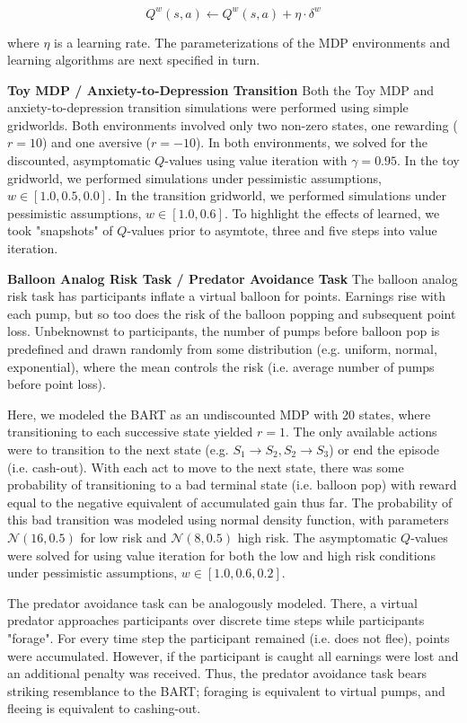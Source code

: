 \documentclass[11pt]{article} %
\begin{document}
\begin{equation*}
Q^w(s,a) \leftarrow Q^w(s,a) + \eta \cdot \delta^w
\end{equation*}

where $\eta$ is a learning rate. The parameterizations of the MDP environments and learning algorithms are next specified in turn.

\textbf{Toy MDP / Anxiety-to-Depression Transition} Both the Toy MDP and anxiety-to-depression transition simulations were performed using simple gridworlds. Both environments involved only two non-zero states, one rewarding ($r=10$) and one aversive ($r=-10$). In both environments, we solved for the discounted, asymptomatic $Q$-values using value iteration with $\gamma = 0.95$. In the toy gridworld, we performed simulations under pessimistic assumptions, $w \in [1.0, 0.5, 0.0]$. In the transition gridworld, we performed simulations under pessimistic assumptions, $w \in [1.0, 0.6]$. To highlight the effects of learned, we took "snapshots" of $Q$-values prior to asymtote, three and five steps into value iteration. 

\textbf{Balloon Analog Risk Task / Predator Avoidance Task} The balloon analog risk task \citep{Lejuez2002} has participants inflate a virtual balloon for points. Earnings rise with each pump, but so too does the risk of the balloon popping and subsequent point loss. Unbeknownst to participants, the number of pumps before balloon pop is predefined and drawn randomly from some distribution (e.g. uniform, normal, exponential), where the mean controls the risk (i.e. average number of pumps before point loss). 

Here, we modeled the BART as an undiscounted MDP with 20 states, where transitioning to each successive state yielded $r=1$. The only available actions were to transition to the next state (e.g. $S_1 \rightarrow S_2, S_2 \rightarrow S_3$) or end the episode (i.e. cash-out). With each act to move to the next state, there was some probability of transitioning to a bad terminal state (i.e. balloon pop) with reward equal to the negative equivalent of accumulated gain thus far. The probability of this bad transition was modeled using normal density function, with parameters $\mathcal{N}(16,0.5)$ for low risk and $\mathcal{N}(8,0.5)$ high risk. The asymptomatic $Q$-values were solved for using value iteration for both the low and high risk conditions under pessimistic assumptions, $w \in [1.0, 0.6, 0.2]$.

The predator avoidance task \citep{fung2019} can be analogously modeled. There, a virtual predator approaches participants over discrete time steps while participants "forage". For every time step the participant remained (i.e. does not flee), points were accumulated. However, if the participant is caught all earnings were lost and an additional penalty was received. Thus, the predator avoidance task bears striking resemblance to the BART; foraging is equivalent to virtual pumps, and fleeing is equivalent to cashing-out.
\end{document}
